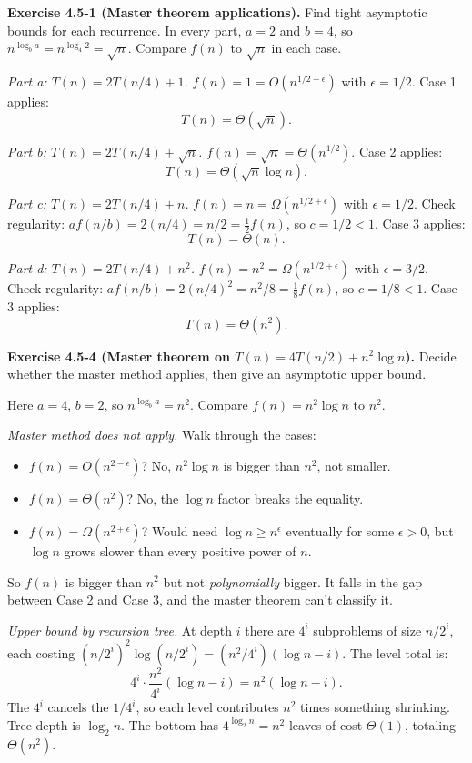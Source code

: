 \documentclass{article}
\theoremstyle{theorem}
\theoremstyle{definition}
\theoremstyle{remark}
\begin{document}
\bigskip

\textbf{Exercise 4.5-1 (Master theorem applications).}
Find tight asymptotic bounds for each recurrence. In every part, $a = 2$ and $b = 4$, so $n^{\log_b a} = n^{\log_4 2} = \sqrt{n}$. Compare $f(n)$ to $\sqrt{n}$ in each case.

\emph{Part a: $T(n) = 2 T(n/4) + 1$.}
$f(n) = 1 = O(n^{1/2 - \epsilon})$ with $\epsilon = 1/2$. Case 1 applies:
\[
  T(n) = \Theta(\sqrt{n}).
\]

\emph{Part b: $T(n) = 2 T(n/4) + \sqrt{n}$.}
$f(n) = \sqrt{n} = \Theta(n^{1/2})$. Case 2 applies:
\[
  T(n) = \Theta(\sqrt{n} \log n).
\]

\emph{Part c: $T(n) = 2 T(n/4) + n$.}
$f(n) = n = \Omega(n^{1/2 + \epsilon})$ with $\epsilon = 1/2$. Check regularity: $a f(n/b) = 2 (n/4) = n/2 = \tfrac{1}{2} f(n)$, so $c = 1/2 < 1$. Case 3 applies:
\[
  T(n) = \Theta(n).
\]

\emph{Part d: $T(n) = 2 T(n/4) + n^2$.}
$f(n) = n^2 = \Omega(n^{1/2 + \epsilon})$ with $\epsilon = 3/2$. Check regularity: $a f(n/b) = 2 (n/4)^2 = n^2/8 = \tfrac{1}{8} f(n)$, so $c = 1/8 < 1$. Case 3 applies:
\[
  T(n) = \Theta(n^2).
\]

\bigskip

\textbf{Exercise 4.5-4 (Master theorem on $T(n) = 4 T(n/2) + n^2 \log n$).}
Decide whether the master method applies, then give an asymptotic upper bound.

Here $a = 4$, $b = 2$, so $n^{\log_b a} = n^2$. Compare $f(n) = n^2 \log n$ to $n^2$.

\emph{Master method does not apply.} Walk through the cases:
\begin{itemize}
  \item $f(n) = O(n^{2 - \epsilon})$? No, $n^2 \log n$ is bigger than $n^2$, not smaller.
  \item $f(n) = \Theta(n^2)$? No, the $\log n$ factor breaks the equality.
  \item $f(n) = \Omega(n^{2 + \epsilon})$? Would need $\log n \geq n^\epsilon$ eventually for some $\epsilon > 0$, but $\log n$ grows slower than every positive power of $n$.
\end{itemize}
So $f(n)$ is bigger than $n^2$ but not \emph{polynomially} bigger. It falls in the gap between Case 2 and Case 3, and the master theorem can't classify it.

\emph{Upper bound by recursion tree.} At depth $i$ there are $4^i$ subproblems of size $n/2^i$, each costing $(n/2^i)^2 \log(n/2^i) = (n^2/4^i)(\log n - i)$. The level total is:
\[
  4^i \cdot \frac{n^2}{4^i}(\log n - i) = n^2 (\log n - i).
\]
The $4^i$ cancels the $1/4^i$, so each level contributes $n^2$ times something shrinking. Tree depth is $\log_2 n$. The bottom has $4^{\log_2 n} = n^2$ leaves of cost $\Theta(1)$, totaling $\Theta(n^2)$.
\end{document}
